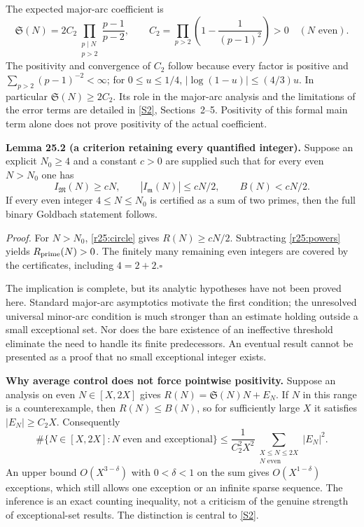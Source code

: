 \documentclass[11pt,a4paper]{article}
\newcommand{\N}{\mathbb{N}}
\newcommand{\sref}[2]{\hyperlink{source:#1:#2}{[S#2]}}
\numberwithin{equation}{section}
\begin{document}
The expected major-arc coefficient is
\begin{equation}\label{r25:singular}
 \mathfrak S(N)=2C_2\prod_{\substack{p\mid N\\p>2}}\frac{p-1}{p-2},
 \qquad C_2=\prod_{p>2}\left(1-\frac1{(p-1)^2}\right)>0
 \quad(N\text{ even}).
\end{equation}
The positivity and convergence of $C_2$ follow because every factor is
positive and $\sum_{p>2}(p-1)^{-2}<\infty$; for $0\le u\le1/4$,
$|\log(1-u)|\le(4/3)u$. In particular $\mathfrak S(N)\ge2C_2$.
Its role in the major-arc analysis and the limitations of the error terms
are detailed in \sref{statement}{2}, Sections~2--5. Positivity of this formal
main term alone does not prove positivity of the actual coefficient.

\textbf{Lemma 25.2 (a criterion retaining every quantified integer).}
Suppose an explicit $N_0\ge4$ and a constant $c>0$ are supplied such that
for every even $N>N_0$ one has
\begin{equation}\label{r25:missing}
 I_{\mathfrak M}(N)\ge cN,\qquad
 |I_{\mathfrak m}(N)|\le cN/2,\qquad B(N)<cN/2.
\end{equation}
If every even integer $4\le N\le N_0$ is certified as a sum of two
primes, then the full binary Goldbach statement follows.

\emph{Proof.} For $N>N_0$, \eqref{r25:circle} gives $R(N)\ge cN/2$.
Subtracting \eqref{r25:powers} yields $R_{\rm prime}(N)>0$. The finitely
many remaining even integers are covered by the certificates, including
$4=2+2$.\hfill$\square$

The implication is complete, but its analytic hypotheses have not been
proved here. Standard major-arc asymptotics motivate the first condition;
the unresolved universal minor-arc condition is much stronger than an
estimate holding outside a small exceptional set. Nor does the bare
existence of an ineffective threshold eliminate the need to handle its
finite predecessors. An eventual result cannot be presented as a proof
that no small exceptional integer exists.

\medskip
\textbf{Why average control does not force pointwise positivity.}
Suppose an analysis on even $N\in[X,2X]$ gives
$R(N)=\mathfrak S(N)N+E_N$. If $N$ in this range is a counterexample,
then $R(N)\le B(N)$, so for sufficiently large $X$ it satisfies
$|E_N|\ge C_2X$. Consequently
\begin{equation}\label{r25:exceptional}
 \#\{N\in[X,2X]:N\text{ even and exceptional}\}
 \le\frac1{C_2^2X^2}\sum_{\substack{X\le N\le2X\\N\text{ even}}}|E_N|^2.
\end{equation}
An upper bound $O(X^{3-\delta})$ with $0<\delta<1$ on the sum gives
$O(X^{1-\delta})$ exceptions, which still allows one exception or an
infinite sparse sequence. The inference is an exact counting inequality,
not a criticism of the genuine strength of exceptional-set results.
The distinction is central to \sref{statement}{2}.
\end{document}
